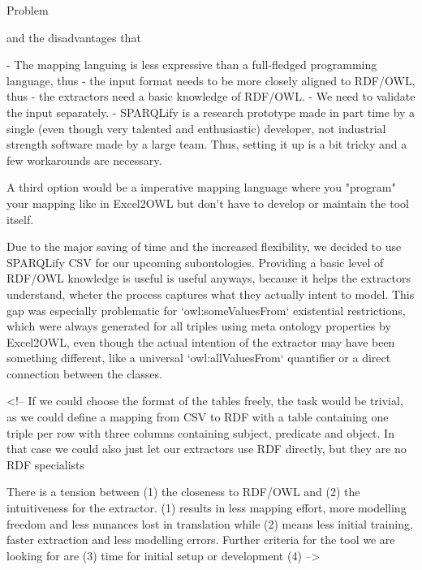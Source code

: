 \documentclass{beamer}
\begin{document}
\begin{frame}{Problem}
\begin{frame}{}
and the disadvantages that

- The mapping languing is less expressive than a full-fledged programming language, thus
- the input format needs to be more closely aligned to RDF/OWL, thus
- the extractors need a basic knowledge of RDF/OWL.
- We need to validate the input separately.
- SPARQLify is a research prototype made in part time by a single (even though very talented and enthusiastic) developer, not industrial strength software made by a large team. Thus, setting it up is a bit tricky and a few workarounds are necessary.

A third option would be a imperative mapping language where you "program" your mapping like in Excel2OWL but don't have to develop or maintain the tool itself.

Due to the major saving of time and the increased flexibility, we decided to use SPARQLify CSV for our upcoming subontologies.
Providing a basic level of RDF/OWL knowledge is useful is useful anyways, because it helps the extractors understand, wheter the process captures what they actually intent to model.
This gap was especially problematic for `owl:someValuesFrom` existential restrictions, which were always generated for all triples using meta ontology properties by Excel2OWL, even though the actual intention of the extractor may have been something different, like a universal `owl:allValuesFrom` quantifier or a direct connection between the classes.


<!--
If we could choose the format of the tables freely, the task would be trivial, as we could define a mapping from CSV to RDF with a table containing one triple per row with three columns containing subject, predicate and object.
In that case we could also just let our extractors use RDF directly, but they are no RDF specialists

There is a tension between (1) the closeness to RDF/OWL and (2) the intuitiveness for the extractor.
(1) results in less mapping effort, more modelling freedom and less nunances lost in translation
while
(2) means less initial training, faster extraction and less modelling errors.
Further criteria for the tool we are looking for are (3) time for initial setup or development (4)
-->


\end{frame}
\end{frame}
\end{document}
